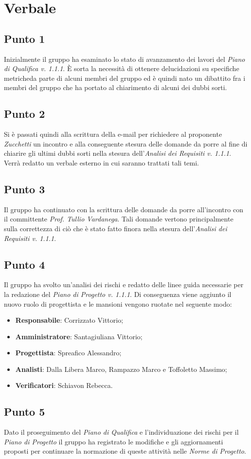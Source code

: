 \section{Verbale}
    \subsection{Punto 1}
        Inizialmente il gruppo ha esaminato lo stato di avanzamento dei lavori del \textit{Piano di Qualifica v. 1.1.1}. È sorta la necessità di ottenere delucidazioni su specifiche metriche\glosp da parte di alcuni membri del gruppo ed è quindi nato un dibattito fra i membri del gruppo che ha portato al chiarimento di alcuni dei dubbi sorti.
    \subsection{Punto 2}
        Si è passati quindi alla scrittura della e-mail per richiedere al proponente \textit{Zucchetti} un incontro e alla conseguente stesura delle domande da porre al fine di chiarire gli ultimi dubbi sorti nella stesura dell'\textit{Analisi dei Requisiti v. 1.1.1}. Verrà redatto un verbale esterno in cui saranno trattati tali temi.
    \subsection{Punto 3}
        Il gruppo ha continuato con la scrittura delle domande da porre all'incontro con il committente \textit{Prof. Tullio Vardanega}. Tali domande vertono principalmente sulla correttezza di ciò che è stato fatto finora nella stesura dell'\textit{Analisi dei Requisiti v. 1.1.1}.
    \subsection{Punto 4}
     	Il gruppo ha svolto un'analisi dei rischi e redatto delle linee guida necessarie per la redazione del \textit{Piano di Progetto v. 1.1.1}. 
        Di conseguenza viene aggiunto il nuovo ruolo di progettista e le mansioni vengono ruotate nel seguente modo:
        \begin{itemize}
            \item \textbf{Responsabile}: Corrizzato Vittorio;
            \item \textbf{Amministratore}: Santagiuliana Vittorio;
            \item \textbf{Progettista}: Spreafico Alessandro;
            \item \textbf{Analisti}: Dalla Libera Marco, Rampazzo Marco e Toffoletto Massimo;
            \item \textbf{Verificatori}: Schiavon Rebecca. 
        \end{itemize}
    \subsection{Punto 5}
        Dato il proseguimento del \textit{Piano di Qualifica} e l'individuazione dei rischi per il \textit{Piano di Progetto} il gruppo ha registrato le modifiche e gli aggiornamenti proposti per continuare la normazione di queste attività nelle \textit{Norme di Progetto}.
    
